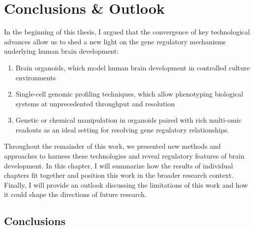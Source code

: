 \thispagestyle{plain}
\section{Conclusions \& Outlook}

In the beginning of this thesis, I argued that the convergence of key technological advances allow us to shed a new light on the gene regulatory mechanisms underlying human brain development:

\begin{enumerate}
    \item Brain organoids, which model human brain development in controlled culture environments 
    \item Single-cell genomic profiling techniques, which allow phenotyping biological systems at unprecedented throughput and resolution
    \item Genetic or chemical manipulation in organoids paired with rich multi-omic readouts as an ideal setting for resolving gene regulatory relationships.
\end{enumerate}

Throughout the remainder of this work, we presented new methods and approaches to harness these technologies and reveal regulatory features of brain development. In this chapter, I will summarize how the results of individual chapters fit together and position this work in the broader research context. Finally, I will provide an outlook discussing the limitations of this work and how it could shape the directions of future research.

\subsection{Conclusions}

